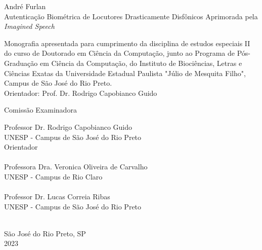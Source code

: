 \documentclass[a4paper,12pt,openright,oneside]{book}
\begin{document}
	\begin{center}
		\vspace{4cm}
		\fontsize{14}{\baselineskip} \selectfont
		\vspace{30.0pt}
		{André Furlan} \\ \vspace{30.0pt}
		{Autenticação Biométrica de Locutores Drasticamente Disfônicos Aprimorada pela \textit{Imagined Speech}} \\ \onehalfspacing \fontsize{14}{\baselineskip} \selectfont
		\par \null
		\begin{flushright}
		\parbox{3.50in}{
			\fontsize{12}{\baselineskip} \selectfont \onehalfspacing
			Monografia apresentada para cumprimento da disciplina de estudos especiais II do curso de Doutorado em Ciência da Computação, junto ao Programa de Pós-Graduação em Ciência da Computação, do Instituto de Biociências, Letras e Ciências Exatas da Universidade Estadual Paulista "Júlio de Mesquita Filho", Campus de São José do Rio Preto. \\ \vspace{1.0pt}
			{Orientador: Prof. Dr. Rodrigo Capobianco Guido } \\ \vspace{1.0pt}
		}
		\end{flushright}
		\fontsize{14}{\baselineskip} \selectfont
		Comissão Examinadora \\  \vspace{1.0pt}
	\end{center}

	\fontsize{14}{\baselineskip} \selectfont
	Professor Dr. Rodrigo Capobianco Guido \\ 
	UNESP - Campus de São José do Rio Preto \\
	Orientador \\\\
	
	Professora Dra. Veronica Oliveira de Carvalho \\ 
	UNESP - Campus de Rio Claro \\\\
	
	Professor Dr. Lucas Correia Ribas \\
	UNESP - Campus de São José do Rio Preto \\\\
	\vspace{3.0cm}

	\begin{center}
		São José do Rio Preto, SP  \\ \vspace{1.0pt}
		2023
	\end{center}
\end{document}
